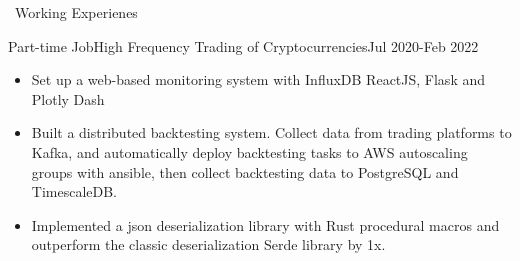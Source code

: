 \documentclass{resume}
\begin{document}
\begin{rSection}{\faUsers~Working Experienes}
\begin{rExperience}{Part-time Job}{High Frequency Trading of Cryptocurrencies}{Jul 2020-Feb 2022}
\begin{itemize}
            \item Set up a web-based monitoring system with InfluxDB ReactJS, Flask and Plotly Dash
            \item Built a distributed backtesting system. Collect data from trading platforms to Kafka, and automatically deploy backtesting tasks to AWS autoscaling groups with ansible, then collect backtesting data to PostgreSQL and TimescaleDB.
            \item Implemented a json deserialization library with Rust procedural macros and outperform the classic deserialization Serde library by 1x.
        \end{itemize}
    \end{rExperience}

\end{rSection}
\end{document}
